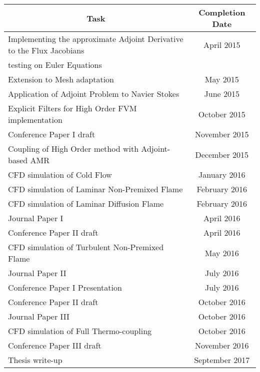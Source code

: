 \begin{tabular}{|l|c|} \hline
\multicolumn{1}{|c|}{\bf{Task}} & \multicolumn{1}{|c|}{\bf{Completion Date}} \\

\hline Implementing the approximate Adjoint Derivative to the Flux Jacobians & April 2015 \\ testing on Euler Equations  &\\

\hline Extension to Mesh adaptation & May 2015\\

\hline Application of Adjoint Problem to Navier Stokes  & June 2015\\

\hline Explicit Filters for High Order FVM implementation  & October 2015\\

\hline Conference Paper I draft & November 2015\\

\hline Coupling of High Order method with Adjoint-based AMR & December 2015\\

\hline CFD simulation of Cold Flow & January 2016\\

\hline CFD simulation of Laminar Non-Premixed Flame & February 2016\\

\hline CFD simulation of Laminar Diffusion Flame & February 2016\\

\hline Journal Paper I & April 2016\\

\hline Conference Paper II draft & April 2016\\

\hline CFD simulation of Turbulent Non-Premixed Flame & May 2016\\

\hline Journal Paper II & July 2016\\

\hline Conference Paper I Presentation  & July 2016\\

\hline Conference Paper II draft  & October 2016\\

\hline Journal Paper III & October 2016\\

\hline CFD simulation of Full Thermo-coupling & October 2016\\

\hline Conference Paper III draft  & November 2016\\

\hline Thesis write-up & September 2017 \\ 

\hline

\end{tabular}
